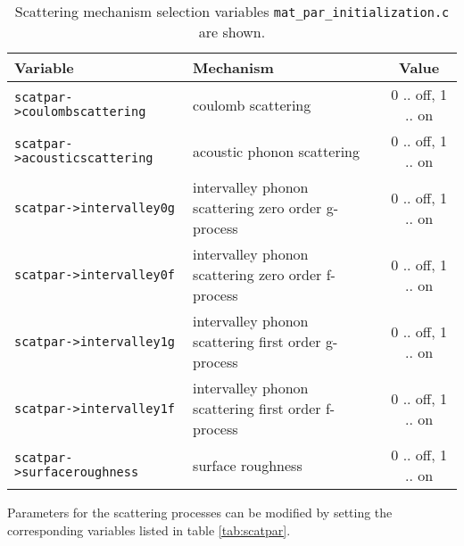 \begin{table}[ht!]
\centering
\begin{tabular}{|l|p{5cm}|c|}
\hline
\textbf{Variable}                    & \textbf{Mechanism}                                  & \textbf{Value} \\
\hline
\texttt{scatpar->coulombscattering}  & coulomb scattering                                  & 0 .. off, 1 .. on \\
\hline
\texttt{scatpar->acousticscattering} & acoustic phonon scattering                          & 0 .. off, 1 .. on \\
\hline
\texttt{scatpar->intervalley0g}      & intervalley phonon scattering zero order g-process  & 0 .. off, 1 .. on \\
\hline
\texttt{scatpar->intervalley0f}      & intervalley phonon scattering zero order f-process  & 0 .. off, 1 .. on \\
\hline
\texttt{scatpar->intervalley1g}      & intervalley phonon scattering first order g-process & 0 .. off, 1 .. on \\
\hline
\texttt{scatpar->intervalley1f}      & intervalley phonon scattering first order f-process & 0 .. off, 1 .. on \\
\hline
\texttt{scatpar->surfaceroughness}   & surface roughness                                   & 0 .. off, 1 .. on \\
\hline
\end{tabular}
\caption{Scattering mechanism selection variables \texttt{mat\_par\_initialization.c} are shown.}
\label{tab:scatflag}
\end{table}

Parameters for the scattering processes can be modified by setting the corresponding variables listed in table \ref{tab:scatpar}.

